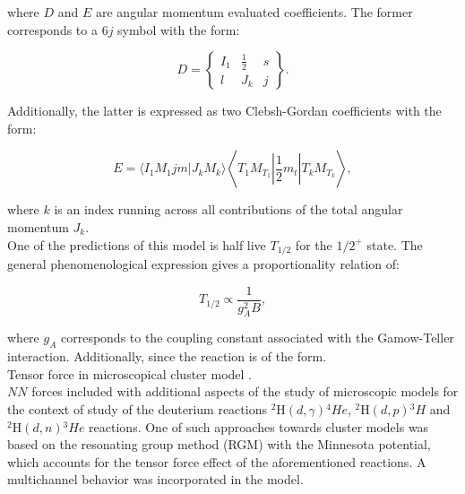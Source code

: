 \documentclass[openany]{book}
\begin{document}
where $D$ and $E$ are angular momentum evaluated coefficients. The former corresponds to a $6j$ symbol with the form: 

\begin{equation}\label{eq:micro_NCSM_beta_antisymmetrization_9j}
	D = \left \{  \begin{matrix}
		I_1 & \frac{1}{2} & s \\
		l 		& J_k & j
	\end{matrix}   \right \}. 
\end{equation}

Additionally, the latter is expressed as two Clebsh-Gordan coefficients with the form: 

\begin{equation}\label{eq:micro_NCSM_beta_antisymmetrization_clebshGordan}
	E =  \langle I_1 M_1 jm |  J_kM_k  \rangle \left \langle T_1 M_{T_1} \left| \frac{1}{2} m_t \right|  T_k M_{T_k} \right  \rangle,
\end{equation}

where $k$ is an index running across all contributions of the total angular momentum $J_k$.  \\

One of the predictions of this model is half live $T_{1/2}$ for the $1/2^{+}$ state. The general phenomenological expression gives a proportionality relation of: 

 \begin{equation}\label{eq:micro_NCSH_beta_halflive}
	T_{1/2} \propto \frac{1}{g^2_A B},
\end{equation}

where $g_A$ corresponds to the coupling constant associated with the Gamow-Teller interaction. Additionally, since the reaction is of the form.\\


Tensor force in microscopical cluster model \cite{arai_aoyama_suzuki_descouvemont_baye_2013}. \\

$NN$ forces included with additional aspects of the study of microscopic models for the context of study of the deuterium reactions $\mathrm{{}^{2}H}(d, \gamma){}^{4}He$, $\mathrm{{}^{2}H}(d, p){}^{3}H$ and $\mathrm{{}^{2}H}(d, n){}^{3}He$ reactions. One of such approaches towards cluster models was based on the resonating group method (RGM) with the Minnesota potential, which accounts for the tensor force effect of the aforementioned reactions. A multichannel behavior was incorporated in the model. 
\end{document}
